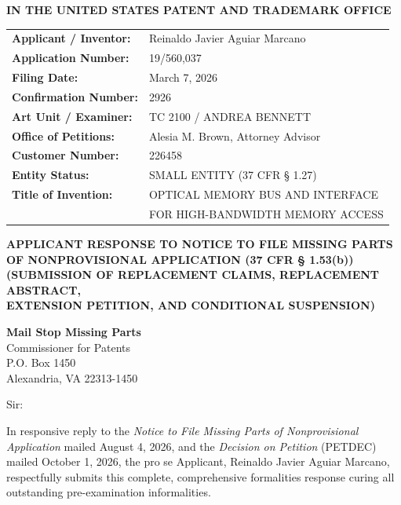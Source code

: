 \documentclass[11pt,letterpaper]{article}
\begin{document}
\thispagestyle{empty}

\begin{center}
    \textbf{\large IN THE UNITED STATES PATENT AND TRADEMARK OFFICE}
\end{center}

\vspace{0.3cm}
\noindent\begin{tabular}{p{2.3in}p{4.0in}}
\textbf{Applicant / Inventor:} & Reinaldo Javier Aguiar Marcano \\
\textbf{Application Number:} & 19/560,037 \\
\textbf{Filing Date:} & March 7, 2026 \\
\textbf{Confirmation Number:} & 2926 \\
\textbf{Art Unit / Examiner:} & TC 2100 / ANDREA BENNETT \\
\textbf{Office of Petitions:} & Alesia M. Brown, Attorney Advisor \\
\textbf{Customer Number:} & 226458 \\
\textbf{Entity Status:} & SMALL ENTITY (37 CFR \S{} 1.27) \\
\textbf{Title of Invention:} & OPTICAL MEMORY BUS AND INTERFACE \\
& FOR HIGH-BANDWIDTH MEMORY ACCESS \\
\end{tabular}

\vspace{0.4cm}
\begin{center}
    \textbf{\large APPLICANT RESPONSE TO NOTICE TO FILE MISSING PARTS \\
    OF NONPROVISIONAL APPLICATION (37 CFR \S{} 1.53(b))} \\
    \textbf{\normalsize (SUBMISSION OF REPLACEMENT CLAIMS, REPLACEMENT ABSTRACT, \\
    EXTENSION PETITION, AND CONDITIONAL SUSPENSION)}
\end{center}

\noindent\textbf{Mail Stop Missing Parts} \\
Commissioner for Patents \\
P.O. Box 1450 \\
Alexandria, VA 22313-1450

\vspace{0.2cm}
Sir:

In responsive reply to the \textit{Notice to File Missing Parts of Nonprovisional Application} mailed August 4, 2026, and the \textit{Decision on Petition} (PETDEC) mailed October 1, 2026, the pro se Applicant, Reinaldo Javier Aguiar Marcano, respectfully submits this complete, comprehensive formalities response curing all outstanding pre-examination informalities.
\end{document}
